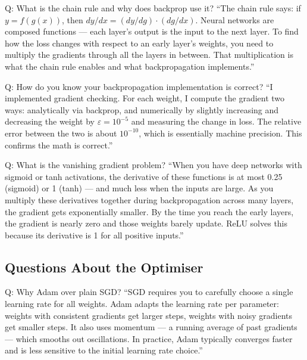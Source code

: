 \documentclass[12pt, a4paper]{article}
\begin{document}
\begin{interviewbox}{Q: What is the chain rule and why does backprop use it?}
``The chain rule says: if $y = f(g(x))$, then $dy/dx = (dy/dg) \cdot (dg/dx)$. Neural networks are composed functions --- each layer's output is the input to the next layer. To find how the loss changes with respect to an early layer's weights, you need to multiply the gradients through all the layers in between. That multiplication is what the chain rule enables and what backpropagation implements.''
\end{interviewbox}

\begin{interviewbox}{Q: How do you know your backpropagation implementation is correct?}
``I implemented gradient checking. For each weight, I compute the gradient two ways: analytically via backprop, and numerically by slightly increasing and decreasing the weight by $\varepsilon = 10^{-5}$ and measuring the change in loss. The relative error between the two is about $10^{-10}$, which is essentially machine precision. This confirms the math is correct.''
\end{interviewbox}

\begin{interviewbox}{Q: What is the vanishing gradient problem?}
``When you have deep networks with sigmoid or tanh activations, the derivative of these functions is at most 0.25 (sigmoid) or 1 (tanh) --- and much less when the inputs are large. As you multiply these derivatives together during backpropagation across many layers, the gradient gets exponentially smaller. By the time you reach the early layers, the gradient is nearly zero and those weights barely update. ReLU solves this because its derivative is 1 for all positive inputs.''
\end{interviewbox}

\subsection{Questions About the Optimiser}

\begin{interviewbox}{Q: Why Adam over plain SGD?}
``SGD requires you to carefully choose a single learning rate for all weights. Adam adapts the learning rate per parameter: weights with consistent gradients get larger steps, weights with noisy gradients get smaller steps. It also uses momentum --- a running average of past gradients --- which smooths out oscillations. In practice, Adam typically converges faster and is less sensitive to the initial learning rate choice.''
\end{interviewbox}
\end{document}
